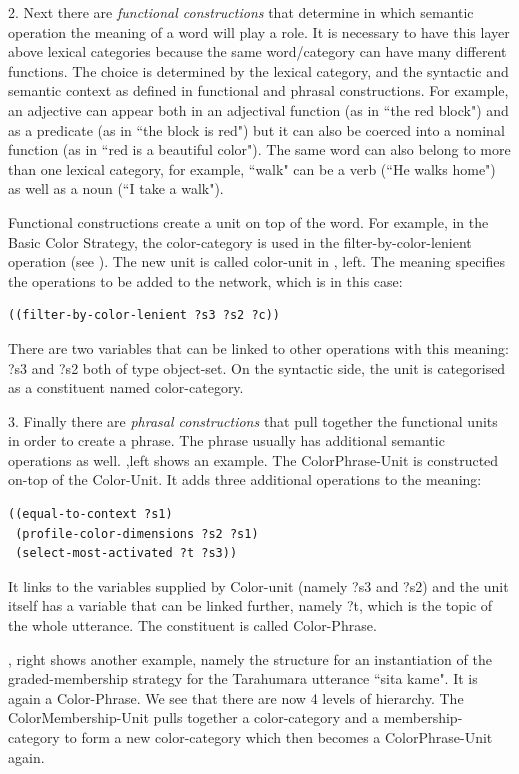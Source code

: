 2. Next there are {\it functional constructions} that determine in which semantic operation the meaning of a word 
will play a role. It is necessary to have this layer above lexical categories because the same word/category can have many 
different functions. The choice is determined by the lexical category, and the syntactic and semantic context as 
defined in functional and phrasal constructions. For example, an adjective can appear both in an adjectival 
function (as in ``the red block") and as a predicate (as in ``the block is red") but it can also be coerced 
into a nominal function (as in ``red is a beautiful color"). The same word can also belong to more than one 
lexical category, for example, ``walk" can be a verb (``He walks home") as well as a noun (``I take a walk"). 

Functional constructions create a unit on top of the word. For example, in the Basic Color Strategy, 
the color-category is used in the filter-by-color-lenient operation (see ). 
The new unit is called color-unit in , left. 
The meaning specifies the operations to be added to the network, which is in this case: 
\begin{verbatim}
((filter-by-color-lenient ?s3 ?s2 ?c))
\end{verbatim}
There are two variables that can be linked to other operations with this meaning: ?s3 and ?s2 both of type object-set. 
On the syntactic side, the unit is categorised as a constituent named color-category. 

3. Finally there are {\it phrasal constructions} that pull together the functional units in order to create a phrase. 
The phrase usually has additional semantic operations as well. ,left shows an example. 
The ColorPhrase-Unit is constructed on-top of the Color-Unit. It adds three additional operations to the meaning: 
\begin{verbatim}
((equal-to-context ?s1)
 (profile-color-dimensions ?s2 ?s1)
 (select-most-activated ?t ?s3))
\end{verbatim}
It links to the variables supplied by Color-unit (namely ?s3 and ?s2) and the unit itself has a variable that can 
be linked further, namely ?t, which is the topic of the whole utterance. 
The constituent is called Color-Phrase. 

, right shows another example, namely the structure for an instantiation of the 
graded-membership strategy for the Tarahumara utterance ``sita kame". It is again a Color-Phrase.
We see that there are now 4 levels of hierarchy. The ColorMembership-Unit pulls together a color-category and 
a membership-category to form a new color-category which then becomes a ColorPhrase-Unit again.\\

